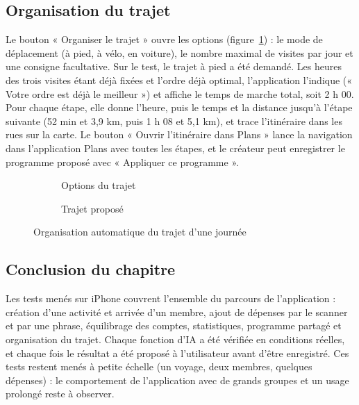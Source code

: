 \subsection{Organisation du trajet}

Le bouton « Organiser le trajet » ouvre les options (figure~\ref{fig:ecran_trajet}) : le
mode de déplacement (à pied, à vélo, en voiture), le nombre maximal de visites par jour et
une consigne facultative. Sur le test, le trajet à pied a été demandé. Les heures des trois
visites étant déjà fixées et l'ordre déjà optimal, l'application l'indique (« Votre ordre est
déjà le meilleur ») et affiche le temps de marche total, soit 2 h 00. Pour chaque étape, elle
donne l'heure, puis le temps et la distance jusqu'à l'étape suivante (52 min et 3,9 km, puis
1 h 08 et 5,1 km), et trace l'itinéraire dans les rues sur la carte. Le bouton « Ouvrir
l'itinéraire dans Plans » lance la navigation dans l'application Plans avec toutes les
étapes, et le créateur peut enregistrer le programme proposé avec « Appliquer ce
programme ».

\begin{figure}[H]
\centering
\begin{subfigure}[t]{0.31\textwidth}\centering{}\caption{Options du trajet}\end{subfigure}\hspace{0.05\textwidth}
\begin{subfigure}[t]{0.31\textwidth}\centering{}\caption{Trajet proposé}\end{subfigure}
\caption{Organisation automatique du trajet d'une journée}
\label{fig:ecran_trajet}
\end{figure}

\subsection{Conclusion du chapitre}

Les tests menés sur iPhone couvrent l'ensemble du parcours de l'application : création d'une
activité et arrivée d'un membre, ajout de dépenses par le scanner et par une phrase,
équilibrage des comptes, statistiques, programme partagé et organisation du trajet. Chaque
fonction d'IA a été vérifiée en conditions réelles, et chaque fois le résultat a été proposé à
l'utilisateur avant d'être enregistré. Ces tests restent menés à petite échelle (un voyage,
deux membres, quelques dépenses) : le comportement de l'application avec de grands groupes
et un usage prolongé reste à observer.
